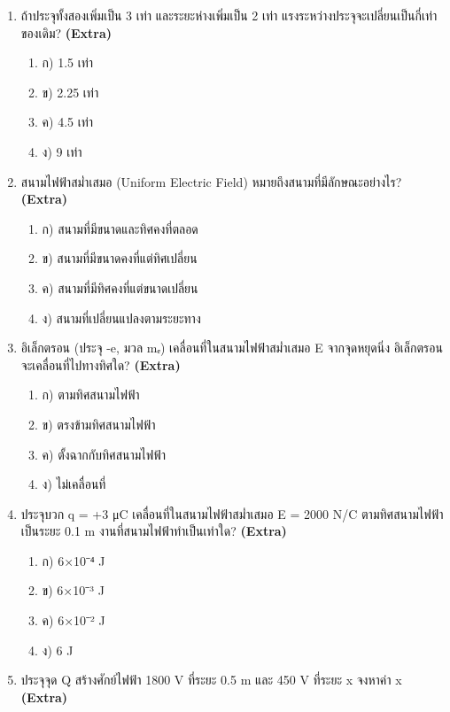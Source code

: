 \documentclass[12pt]{article}
\begin{document}
\begin{enumerate}[label=\arabic*.]
\begin{enumerate}[label=)]
\item ง) 8.85×10⁻¹² N·m²/C²
\end{enumerate}
\item ถ้าประจุทั้งสองเพิ่มเป็น 3 เท่า และระยะห่างเพิ่มเป็น 2 เท่า แรงระหว่างประจุจะเปลี่ยนเป็นกี่เท่าของเดิม? \hfill \textbf{\small (Extra)}
\begin{enumerate}[label=)]
\item ก) 1.5 เท่า
\item ข) 2.25 เท่า
\item ค) 4.5 เท่า
\item ง) 9 เท่า
\end{enumerate}
\item สนามไฟฟ้าสม่ำเสมอ (Uniform Electric Field) หมายถึงสนามที่มีลักษณะอย่างไร? \hfill \textbf{\small (Extra)}
\begin{enumerate}[label=)]
\item ก) สนามที่มีขนาดและทิศคงที่ตลอด
\item ข) สนามที่มีขนาดคงที่แต่ทิศเปลี่ยน
\item ค) สนามที่มีทิศคงที่แต่ขนาดเปลี่ยน
\item ง) สนามที่เปลี่ยนแปลงตามระยะทาง
\end{enumerate}
\item อิเล็กตรอน (ประจุ -e, มวล mₑ) เคลื่อนที่ในสนามไฟฟ้าสม่ำเสมอ E จากจุดหยุดนิ่ง อิเล็กตรอนจะเคลื่อนที่ไปทางทิศใด? \hfill \textbf{\small (Extra)}
\begin{enumerate}[label=)]
\item ก) ตามทิศสนามไฟฟ้า
\item ข) ตรงข้ามทิศสนามไฟฟ้า
\item ค) ตั้งฉากกับทิศสนามไฟฟ้า
\item ง) ไม่เคลื่อนที่
\end{enumerate}
\item ประจุบวก q = +3 μC เคลื่อนที่ในสนามไฟฟ้าสม่ำเสมอ E = 2000 N/C ตามทิศสนามไฟฟ้าเป็นระยะ 0.1 m งานที่สนามไฟฟ้าทำเป็นเท่าใด? \hfill \textbf{\small (Extra)}
\begin{enumerate}[label=)]
\item ก) 6×10⁻⁴ J
\item ข) 6×10⁻³ J
\item ค) 6×10⁻² J
\item ง) 6 J
\end{enumerate}
\item ประจุจุด Q สร้างศักย์ไฟฟ้า 1800 V ที่ระยะ 0.5 m และ 450 V ที่ระยะ x จงหาค่า x \hfill \textbf{\small (Extra)}
\begin{enumerate}[label=)]

\end{enumerate}
\end{enumerate}
\end{document}
